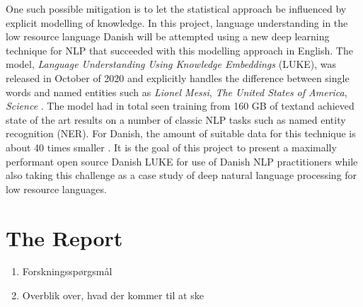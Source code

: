 \documentclass[main.tex]{subfiles}
\begin{document}
One such possible mitigation is to let the statistical approach be influenced by explicit modelling of knowledge.
In this project, language understanding in the low resource language Danish will be attempted using a new deep learning technique for NLP that succeeded with this modelling approach in English.
The model, \emph{Language Understanding Using Knowledge Embeddings} (LUKE), was released in October of 2020 and explicitly handles the difference between single words and named entities such as \emph{Lionel Messi}, \emph{The United States of America}, \emph{Science} \cite{yamada2020luke}.
The model had in total seen training from 160 GB of text\footnotemark and achieved state of the art results on a number of classic NLP tasks such as named entity recognition (NER).
For Danish, the amount of suitable data for this technique is about 40 times smaller \footnotemark.
It is the goal of this project to present a maximally performant open source Danish LUKE for use of Danish NLP practitioners while also taking this challenge as a case study of deep natural language processing for low resource languages.

\section{The Report}%
\label{sec:The Report}
\begin{enumerate}
    \item Forskningsspørgsmål
    \item Overblik over, hvad der kommer til at ske
\end{enumerate}
\end{document}
